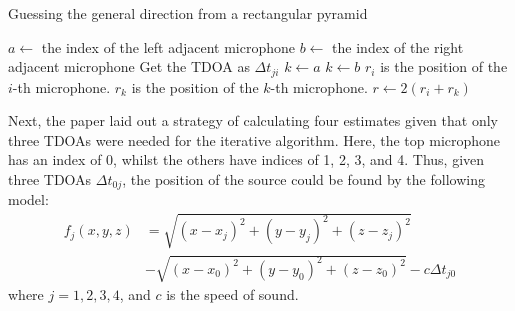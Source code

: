 \documentclass[notitlepage]{report}
\begin{document}
\begin{algorithm}[H]
\caption{Guessing the general direction from a rectangular pyramid}
\label{alg:pyramid_guess}
\begin{algorithmic}
		\State $a \gets$ the index of the left adjacent microphone
		\State $b \gets$ the index of the right adjacent microphone
			\State Get the TDOA as $\Delta t_{ji}$
		\EndFor
				\State $k \gets a$
			\Else
				\State $k \gets b$
			\EndIf
			\State $r_i$ is the position of the $i$-th microphone.
			\State $r_k$ is the position of the $k$-th microphone.
			\State $r \gets 2 (r_{i} + r_{k})$ 
		\EndIf
	\EndFor
\end{algorithmic}
\end{algorithm}

Next, the paper laid out a strategy of calculating four estimates given that only three TDOAs were needed for the iterative algorithm. Here, the top microphone has an index of 0, whilst the others have indices of 1, 2, 3, and 4. Thus, given three TDOAs $\Delta t_{0j}$, the position of the source could be found by the following model:
\begin{equation}
\begin{split}
f_j(x,y,z) &= \sqrt{\left(x-x_j\right)^2 + (y - y_j)^2 + (z - z_j)^2} \\
&- \sqrt{\left(x-x_0\right)^2 + (y - y_0)^2 + (z - z_0)^2}
- c \Delta t_{j0}
\end{split}
\end{equation}
where $j = 1, 2, 3, 4$, and $c$ is the speed of sound.
\end{document}
